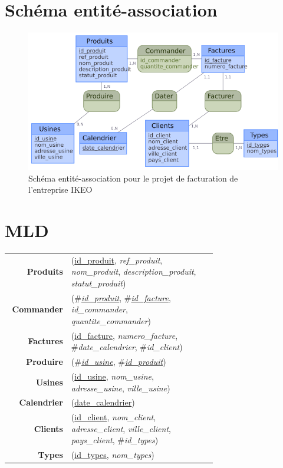 \documentclass[french]{article}
\newenvironment{mld}
  {\par\begin{minipage}{\linewidth}\begin{tabular}{rp{0.7\linewidth}}}
  {\end{tabular}\end{minipage}\par}
\newcommand{\attr}[1]{\emph{#1}}
\newcommand{\prim}[1]{\uline{#1}}
\newcommand{\foreign}[1]{\#\textsl{#1}}
\begin{document}
\section{Schéma entité-association}

\begin{figure}[!htbp]
    \centering
    \includegraphics[width=\textwidth]{Rapport/Image/schema_EA.png}
    \caption{Schéma entité-association pour le projet de facturation de l'entreprise IKEO}
    \label{fig:schema_EA}
\end{figure}
    
\section{MLD}


\begin{mld}
  \textbf{Produits} & (\prim{id\_produit}, \attr{ref\_produit}, \attr{nom\_produit}, \attr{description\_produit}, \attr{statut\_produit})\\
  \textbf{Commander} & (\foreign{\prim{id\_produit}}, \foreign{\prim{id\_facture}}, \attr{id\_commander}, \attr{quantite\_commander})\\
  \textbf{Factures} & (\prim{id\_facture}, \attr{numero\_facture}, \foreign{date\_calendrier}, \foreign{id\_client})\\
  \textbf{Produire} & (\foreign{\prim{id\_usine}}, \foreign{\prim{id\_produit}})\\
  \textbf{Usines} & (\prim{id\_usine}, \attr{nom\_usine}, \attr{adresse\_usine}, \attr{ville\_usine})\\
  \textbf{Calendrier} & (\prim{date\_calendrier})\\
  \textbf{Clients} & (\prim{id\_client}, \attr{nom\_client}, \attr{adresse\_client}, \attr{ville\_client}, \attr{pays\_client}, \foreign{id\_types})\\
  \textbf{Types} & (\prim{id\_types}, \attr{nom\_types})\\
\end{mld}
\end{document}
